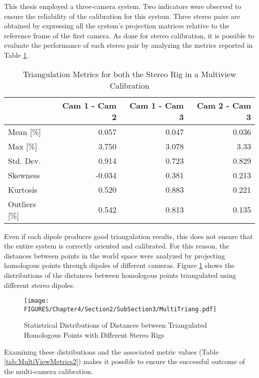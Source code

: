 This thesis employed a three-camera system. Two indicators were observed to ensure the reliability of the calibration for this system.
Three stereo pairs are obtained by expressing all the system's projection matrices relative to the reference frame of the first camera. As done for stereo calibration, it is possible to evaluate the performance of each stereo pair by analyzing the metrics reported in Table \ref{tab:MultiViewMetrics1}.

\begin{table}[h]
  \centering
  \begin{tabular}{lrrr}
  \toprule
  & Cam 1 - Cam 2 & Cam 1 - Cam 3 & Cam 2 - Cam 3 \\
  \midrule
  Mean [\%]     & 0.057 & 0.047 & 0.036 \\
  Max [\%]      & 3.750 & 3.078 & 3.33 \\
  Std. Dev.     & 0.914 & 0.723 & 0.829 \\
  Skewness      & -0.034 & 0.381 & 0.213 \\
  Kurtosis      & 0.520 & 0.883 & 0.221 \\
  Outliers [\%] & 0.542 & 0.813 & 0.135 \\
  \bottomrule
  \end{tabular}
  \caption{Triangulation Metrics for both the Stereo Rig in a Multiview Calibration}
  \label{tab:MultiViewMetrics1}
\end{table}

Even if each dipole produces good triangulation results, this does not ensure that the entire system is correctly oriented and calibrated.
For this reason, the distances between points in the world space were analyzed by projecting homologous points through dipoles of different cameras.
Figure \ref{fig:MultiTriang} shows the distributions of the distances between homologous points triangulated using different stereo dipoles.

\begin{figure}[!h]
  \centering
  \texttt{[image: FIGURES/Chapter4/Section2/SubSection3/MultiTriang.pdf]}
  \caption{Statistrical Distributions of Distances between Triangulated Homologous Points with Different Stereo Rigs}
  \label{fig:MultiTriang}  
\end{figure}

Examining these distributions and the associated metric values (Table \ref{tab:MultiViewMetrics2}) makes it possible to ensure the successful outcome of the multi-camera calibration.

